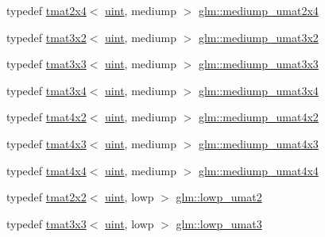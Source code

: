 \begin{DoxyCompactItemize}
\item 
typedef \hyperlink{structglm_1_1tmat2x4}{tmat2x4}$<$ \hyperlink{group__core__precision_ga4fd29415871152bfb5abd588334147c8}{uint}, mediump $>$ \hyperlink{group__gtc__matrix__integer_ga972445669c6e6652716f3f0b664b94cd}{glm\+::mediump\+\_\+umat2x4}
\item 
typedef \hyperlink{structglm_1_1tmat3x2}{tmat3x2}$<$ \hyperlink{group__core__precision_ga4fd29415871152bfb5abd588334147c8}{uint}, mediump $>$ \hyperlink{group__gtc__matrix__integer_ga62243caa5b85b1cf91021ce6ffc21183}{glm\+::mediump\+\_\+umat3x2}
\item 
typedef \hyperlink{structglm_1_1tmat3x3}{tmat3x3}$<$ \hyperlink{group__core__precision_ga4fd29415871152bfb5abd588334147c8}{uint}, mediump $>$ \hyperlink{group__gtc__matrix__integer_gaa55f7815a399a780907a1dcd4caef7d9}{glm\+::mediump\+\_\+umat3x3}
\item 
typedef \hyperlink{structglm_1_1tmat3x4}{tmat3x4}$<$ \hyperlink{group__core__precision_ga4fd29415871152bfb5abd588334147c8}{uint}, mediump $>$ \hyperlink{group__gtc__matrix__integer_ga21a2361cc10822ad1a2297ac286c8e26}{glm\+::mediump\+\_\+umat3x4}
\item 
typedef \hyperlink{structglm_1_1tmat4x2}{tmat4x2}$<$ \hyperlink{group__core__precision_ga4fd29415871152bfb5abd588334147c8}{uint}, mediump $>$ \hyperlink{group__gtc__matrix__integer_ga9dd5ce011ca43d90cf1b94084c7e90ac}{glm\+::mediump\+\_\+umat4x2}
\item 
typedef \hyperlink{structglm_1_1tmat4x3}{tmat4x3}$<$ \hyperlink{group__core__precision_ga4fd29415871152bfb5abd588334147c8}{uint}, mediump $>$ \hyperlink{group__gtc__matrix__integer_gac91ed5aa76fe160d5ab5d31e2b94d95b}{glm\+::mediump\+\_\+umat4x3}
\item 
typedef \hyperlink{structglm_1_1tmat4x4}{tmat4x4}$<$ \hyperlink{group__core__precision_ga4fd29415871152bfb5abd588334147c8}{uint}, mediump $>$ \hyperlink{group__gtc__matrix__integer_ga7141a9d9f1c26521e397be34d19c1b8f}{glm\+::mediump\+\_\+umat4x4}
\item 
typedef \hyperlink{structglm_1_1tmat2x2}{tmat2x2}$<$ \hyperlink{group__core__precision_ga4fd29415871152bfb5abd588334147c8}{uint}, lowp $>$ \hyperlink{group__gtc__matrix__integer_ga0ff71fefa5bfab1462195c3de4f83f67}{glm\+::lowp\+\_\+umat2}
\item 
typedef \hyperlink{structglm_1_1tmat3x3}{tmat3x3}$<$ \hyperlink{group__core__precision_ga4fd29415871152bfb5abd588334147c8}{uint}, lowp $>$ \hyperlink{group__gtc__matrix__integer_ga71b66cc4f5e2d30b64ec99425562a6b6}{glm\+::lowp\+\_\+umat3}

\end{DoxyCompactItemize}
